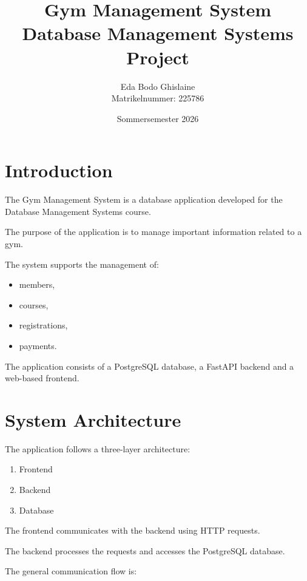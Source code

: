 \documentclass[12pt,a4paper]{article}
\title{
    \textbf{Gym Management System}\\
    \large Database Management Systems Project
}
\author{
    Eda Bodo Ghislaine\\ 
    Matrikelnummer: 225786
}
\date{Sommersemester 2026}
\begin{document}
\maketitle
\tableofcontents
\newpage



\section{Introduction}

The Gym Management System is a database application developed
for the Database Management Systems course.

The purpose of the application is to manage important information
related to a gym.

The system supports the management of:

\begin{itemize}
    \item members,
    \item courses,
    \item registrations,
    \item payments.
\end{itemize}

The application consists of a PostgreSQL database, a FastAPI
backend and a web-based frontend.



\section{System Architecture}

The application follows a three-layer architecture:

\begin{enumerate}
    \item Frontend
    \item Backend
    \item Database
\end{enumerate}

The frontend communicates with the backend using HTTP requests.

The backend processes the requests and accesses the PostgreSQL
database.

The general communication flow is:
\end{document}
